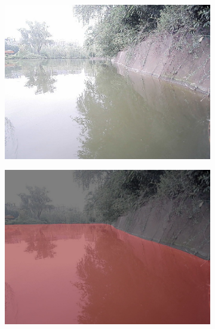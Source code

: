 \documentclass[cn,12pt,color=mine,scheme=chinese,bibstyle=gb7714-2015]{elegantbook}
\begin{document}
\begin{figure}[h]
\begin{subfigure}[b]{0.23\linewidth}
	\end{subfigure}\\
	\vspace{1mm}
	\begin{subfigure}[b]{0.23\linewidth}
		\centering\includegraphics[width=\linewidth]{results2/test4}
	\end{subfigure}
	\begin{subfigure}[b]{0.23\linewidth}
		\centering\includegraphics[width=\linewidth]{results2/test4deeplab}
	\end{subfigure}
	\begin{subfigure}[b]{0.23\linewidth}

\end{subfigure}
\end{figure}
\end{document}
